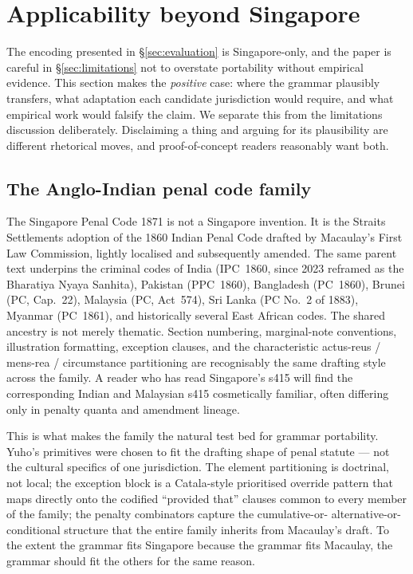 \section{Applicability beyond Singapore}
\label{sec:applicability}

The encoding presented in \S\ref{sec:evaluation} is Singapore-only,
and the paper is careful in \S\ref{sec:limitations} not to overstate
portability without empirical evidence. This section makes the
\emph{positive} case: where the grammar plausibly transfers, what
adaptation each candidate jurisdiction would require, and what
empirical work would falsify the claim. We separate this from the
limitations discussion deliberately. Disclaiming a thing and arguing
for its plausibility are different rhetorical moves, and
proof-of-concept readers reasonably want both.

\subsection{The Anglo-Indian penal code family}
\label{subsec:anglo_indian_family}

The Singapore Penal Code 1871 is not a Singapore invention. It is the
Straits Settlements adoption of the 1860 Indian Penal Code drafted by
Macaulay's First Law Commission, lightly localised and subsequently
amended. The same parent text underpins the criminal codes of India
(IPC~1860, since 2023 reframed as the Bharatiya Nyaya Sanhita),
Pakistan (PPC~1860), Bangladesh (PC~1860), Brunei (PC, Cap.~22),
Malaysia (PC, Act~574), Sri Lanka (PC No.~2 of 1883), Myanmar
(PC~1861), and historically several East African codes. The shared
ancestry is not merely thematic. Section numbering, marginal-note
conventions, illustration formatting, exception clauses, and the
characteristic actus-reus / mens-rea / circumstance partitioning are
recognisably the same drafting style across the family. A reader who
has read Singapore's s415 will find the corresponding Indian and
Malaysian s415 cosmetically familiar, often differing only in
penalty quanta and amendment lineage.

This is what makes the family the natural test bed for grammar
portability. Yuho's primitives were chosen to fit the drafting shape
of penal statute --- not the cultural specifics of one jurisdiction.
The element partitioning is doctrinal, not local; the exception block
is a Catala-style prioritised override pattern that maps directly
onto the codified ``provided that'' clauses common to every member of
the family; the penalty combinators capture the cumulative-or-
alternative-or-conditional structure that the entire family inherits
from Macaulay's draft. To the extent the grammar fits Singapore
because the grammar fits Macaulay, the grammar should fit the others
for the same reason.

